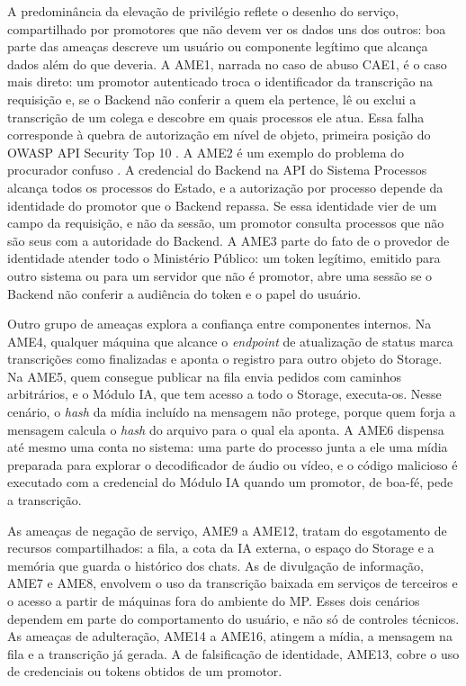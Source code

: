\documentclass[12pt]{article}
\begin{document}
    A predominância da elevação de privilégio reflete o desenho do serviço, compartilhado por promotores que não devem ver os dados uns dos outros: boa parte das ameaças descreve um usuário ou componente legítimo que alcança dados além do que deveria. A AME1, narrada no caso de abuso CAE1, é o caso mais direto: um promotor autenticado troca o identificador da transcrição na requisição e, se o Backend não conferir a quem ela pertence, lê ou exclui a transcrição de um colega e descobre em quais processos ele atua. Essa falha corresponde à quebra de autorização em nível de objeto, primeira posição do OWASP API Security Top 10 \cite{owasp:api10}. A AME2 é um exemplo do problema do procurador confuso \cite{hardy:88}.
    A credencial do Backend na API do Sistema Processos alcança todos os processos do Estado, e a autorização por processo depende da identidade do promotor que o Backend repassa. Se essa identidade vier de um campo da requisição, e não da sessão, um promotor consulta processos que não são seus com a autoridade do Backend. A AME3 parte do fato de o provedor de identidade atender todo o Ministério Público: um token legítimo, emitido para outro sistema ou para um servidor que não é promotor, abre uma sessão se o Backend não conferir a audiência do token e o papel do usuário.

    Outro grupo de ameaças explora a confiança entre componentes internos. Na AME4, qualquer máquina que alcance o \textit{endpoint} de atualização de status marca transcrições como finalizadas e aponta o registro para outro objeto do Storage. Na AME5, quem consegue publicar na fila envia pedidos com caminhos arbitrários, e o Módulo IA, que tem acesso a todo o Storage, executa-os. Nesse cenário, o \textit{hash} da mídia incluído na mensagem não protege, porque quem forja a mensagem calcula o \textit{hash} do arquivo para o qual ela aponta. A AME6 dispensa até mesmo uma conta no sistema: uma parte do processo junta a ele uma mídia preparada para explorar o decodificador de áudio ou vídeo, e o código malicioso é executado com a credencial do Módulo IA quando um promotor, de boa-fé, pede a transcrição.

    As ameaças de negação de serviço, AME9 a AME12, tratam do esgotamento de recursos compartilhados: a fila, a cota da IA externa, o espaço do Storage e a memória que guarda o histórico dos chats. As de divulgação de informação, AME7 e AME8, envolvem o uso da transcrição baixada em serviços de terceiros e o acesso a partir de máquinas fora do ambiente do MP. Esses dois cenários dependem em parte do comportamento do usuário, e não só de controles técnicos. As ameaças de adulteração, AME14 a AME16, atingem a mídia, a mensagem na fila e a transcrição já gerada. A de falsificação de identidade, AME13, cobre o uso de credenciais ou tokens obtidos de um promotor.
\end{document}
